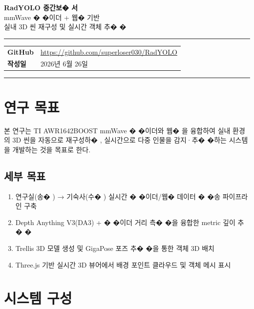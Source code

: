 \documentclass[a4paper,12pt]{article}
\begin{document}
\begin{titlepage}
  \centering
  \vspace*{3cm}
  {\LARGE \textbf{RadYOLO 중간보� 서}} \\[1em]
  {\large mmWave � �이더 + 웹�  기반\\실내 3D 씬 재구성 및 실시간 객체 추� �} \\[3em]
  \hrule
  \vspace{1em}
  \begin{tabular}{ll}
    \textbf{GitHub} & \url{https://github.com/superloser030/RadYOLO} \\[0.5em]
    \textbf{작성일} & 2026년 6월 26일 \\
  \end{tabular}
  \vspace{1em}
  \hrule
  \vfill
\end{titlepage}

\tableofcontents
\newpage

\section{연구 목표}

본 연구는 TI AWR1642BOOST mmWave � �이더와 웹� 을 융합하여
실내 환경의 3D 씬을 자동으로 재구성하� ,
실시간으로 다중 인물을 감지·추� �하는 시스템을 개발하는 것을 목표로 한다.

\subsection{세부 목표}

\begin{enumerate}[leftmargin=2em]
  \item 연구실(송� ) → 기숙사(수� ) 실시간 � �이더/웹�  데이터 � �송 파이프라인 구축
  \item Depth Anything V3(DA3) + � �이더 거리 측� �을 융합한 metric 깊이 추� �
  \item Trellis 3D 모델 생성 및 GigaPose 포즈 추� �을 통한 객체 3D 배치
  \item Three.js 기반 실시간 3D 뷰어에서 배경 포인트 클라우드 및 객체 메시 표시
\end{enumerate}

\section{시스템 구성}
\end{document}
